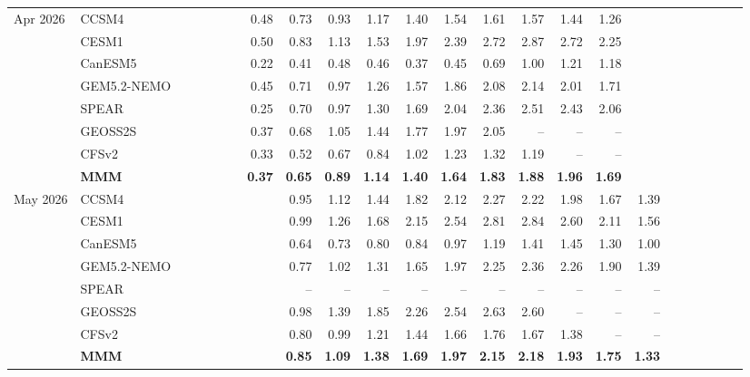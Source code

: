 \documentclass{article}
\begin{document}
\begin{longtable}{llrrrrrrrrrrrrrrrrrrrrrr}
\midrule
Apr 2026 & CCSM4 &  &  &  &  &  & 0.48 & 0.73 & 0.93 & 1.17 & 1.40 & 1.54 & 1.61 & 1.57 & 1.44 & 1.26 &  &  &  &  &  &  &  \\
 & CESM1 &  &  &  &  &  & 0.50 & 0.83 & 1.13 & 1.53 & 1.97 & 2.39 & 2.72 & 2.87 & 2.72 & 2.25 &  &  &  &  &  &  &  \\
 & CanESM5 &  &  &  &  &  & 0.22 & 0.41 & 0.48 & 0.46 & 0.37 & 0.45 & 0.69 & 1.00 & 1.21 & 1.18 &  &  &  &  &  &  &  \\
 & GEM5.2-NEMO &  &  &  &  &  & 0.45 & 0.71 & 0.97 & 1.26 & 1.57 & 1.86 & 2.08 & 2.14 & 2.01 & 1.71 &  &  &  &  &  &  &  \\
 & SPEAR &  &  &  &  &  & 0.25 & 0.70 & 0.97 & 1.30 & 1.69 & 2.04 & 2.36 & 2.51 & 2.43 & 2.06 &  &  &  &  &  &  &  \\
 & GEOSS2S &  &  &  &  &  & 0.37 & 0.68 & 1.05 & 1.44 & 1.77 & 1.97 & 2.05 & -- & -- & -- &  &  &  &  &  &  &  \\
 & CFSv2 &  &  &  &  &  & 0.33 & 0.52 & 0.67 & 0.84 & 1.02 & 1.23 & 1.32 & 1.19 & -- & -- &  &  &  &  &  &  &  \\
 & \textbf{MMM} &  &  &  &  &  & \textbf{0.37} & \textbf{0.65} & \textbf{0.89} & \textbf{1.14} & \textbf{1.40} & \textbf{1.64} & \textbf{1.83} & \textbf{1.88} & \textbf{1.96} & \textbf{1.69} &  &  &  &  &  &  &  \\
\midrule
May 2026 & CCSM4 &  &  &  &  &  &  & 0.95 & 1.12 & 1.44 & 1.82 & 2.12 & 2.27 & 2.22 & 1.98 & 1.67 & 1.39 &  &  &  &  &  &  \\
 & CESM1 &  &  &  &  &  &  & 0.99 & 1.26 & 1.68 & 2.15 & 2.54 & 2.81 & 2.84 & 2.60 & 2.11 & 1.56 &  &  &  &  &  &  \\
 & CanESM5 &  &  &  &  &  &  & 0.64 & 0.73 & 0.80 & 0.84 & 0.97 & 1.19 & 1.41 & 1.45 & 1.30 & 1.00 &  &  &  &  &  &  \\
 & GEM5.2-NEMO &  &  &  &  &  &  & 0.77 & 1.02 & 1.31 & 1.65 & 1.97 & 2.25 & 2.36 & 2.26 & 1.90 & 1.39 &  &  &  &  &  &  \\
 & SPEAR &  &  &  &  &  &  & -- & -- & -- & -- & -- & -- & -- & -- & -- & -- &  &  &  &  &  &  \\
 & GEOSS2S &  &  &  &  &  &  & 0.98 & 1.39 & 1.85 & 2.26 & 2.54 & 2.63 & 2.60 & -- & -- & -- &  &  &  &  &  &  \\
 & CFSv2 &  &  &  &  &  &  & 0.80 & 0.99 & 1.21 & 1.44 & 1.66 & 1.76 & 1.67 & 1.38 & -- & -- &  &  &  &  &  &  \\
 & \textbf{MMM} &  &  &  &  &  &  & \textbf{0.85} & \textbf{1.09} & \textbf{1.38} & \textbf{1.69} & \textbf{1.97} & \textbf{2.15} & \textbf{2.18} & \textbf{1.93} & \textbf{1.75} & \textbf{1.33} &  &  &  &  &  &  \\

\end{longtable}
\end{document}

